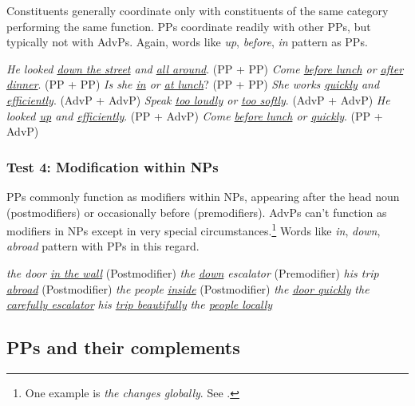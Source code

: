 Constituents generally coordinate only with constituents of the same category performing the same function. PPs coordinate readily with other PPs, but typically not with AdvPs. Again, words like \textit{up}, \textit{before}, \textit{in} pattern as PPs.

\ea\label{ex:pp-coord} %
   \ea \textit{He looked \uline{down the street} and \uline{all around}}. (PP + PP)
   \ex \textit{Come \uline{before lunch} or \uline{after dinner}}. (PP + PP)
   \ex \textit{Is she \uline{in} or \uline{at lunch}}? (PP + PP)
   \z
\z
\ea\label{ex:advp-coord} %
   \ea \textit{She works \uline{quickly} and \uline{efficiently}}. (AdvP + AdvP)
   \ex \textit{Speak \uline{too loudly} or \uline{too softly}}. (AdvP + AdvP)
   \z
\z
\ea\label{ex:mixed-coord} %
   \ea *\textit{He looked \uline{up} and \uline{efficiently}}. (PP + AdvP)
   \ex *\textit{Come \uline{before lunch} or \uline{quickly}}. (PP + AdvP)
   \z
\z

\subsubsection*{Test 4: Modification within NPs}\label{sec:test-np-mod}

PPs commonly function as modifiers within NPs, appearing after the head noun (postmodifiers) or occasionally before (premodifiers). AdvPs can't function as modifiers in NPs except in very special circumstances.\footnote{One example is \textit{the changes globally}. See \textcite[]{payne2010}.} Words like \textit{in}, \textit{down}, \textit{abroad} pattern with PPs in this regard.

\ea\label{ex:pp-np-mod} %
   \ea \textit{the door \uline{in the wall}} (Postmodifier)
   \ex \textit{the \uline{down} escalator} (Premodifier)
   \ex \textit{his trip \uline{abroad}} (Postmodifier)
   \ex \textit{the people \uline{inside}} (Postmodifier)
   \z
\z
\ea\label{ex:advp-np-mod} %
   \ea *\textit{the \uline{door quickly}}
   \ex *\textit{the \uline{carefully escalator}}
   \ex *\textit{his \uline{trip beautifully}}
   \ex *\textit{the \uline{people locally}}
   \z
\z{}

\subsection{PPs and their complements}

